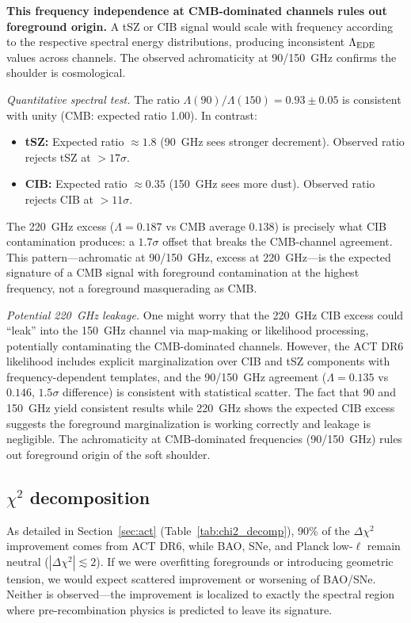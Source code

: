 \documentclass[twocolumn,showpacs,preprintnumbers,amsmath,amssymb,prd]{revtex4-2}
\begin{document}
\textbf{This frequency independence at CMB-dominated channels rules out 
foreground origin.} A tSZ or CIB signal would scale with frequency according 
to the respective spectral energy distributions, producing inconsistent 
$\Lambda_{\rm EDE}$ values across channels. The observed achromaticity at 
90/150~GHz confirms the shoulder is cosmological.

\emph{Quantitative spectral test.} The ratio $\Lambda(90)/\Lambda(150) = 
0.93 \pm 0.05$ is consistent with unity (CMB: expected ratio 1.00). 
In contrast:
\begin{itemize}
\item \textbf{tSZ:} Expected ratio $\approx 1.8$ (90~GHz sees stronger decrement). 
Observed ratio rejects tSZ at $>17\sigma$.
\item \textbf{CIB:} Expected ratio $\approx 0.35$ (150~GHz sees more dust). 
Observed ratio rejects CIB at $>11\sigma$.
\end{itemize}
The 220~GHz excess ($\Lambda = 0.187$ vs CMB average $0.138$) is precisely 
what CIB contamination produces: a $1.7\sigma$ offset that breaks the 
CMB-channel agreement. This pattern---achromatic at 90/150~GHz, excess 
at 220~GHz---is the expected signature of a CMB signal with foreground 
contamination at the highest frequency, not a foreground masquerading as CMB.

\emph{Potential 220~GHz leakage.} One might worry that the 220~GHz CIB 
excess could ``leak'' into the 150~GHz channel via map-making or likelihood 
processing, potentially contaminating the CMB-dominated channels. However, 
the ACT DR6 likelihood includes explicit marginalization over CIB and tSZ 
components with frequency-dependent templates, and the 90/150~GHz agreement 
($\Lambda = 0.135$ vs $0.146$, $1.5\sigma$ difference) is consistent with 
statistical scatter. The fact that 90 and 150~GHz yield consistent results 
while 220~GHz shows the expected CIB excess suggests the foreground 
marginalization is working correctly and leakage is negligible. The 
achromaticity at CMB-dominated frequencies (90/150~GHz) rules out foreground 
origin of the soft shoulder.

\subsection{$\chi^2$ decomposition}

As detailed in Section~\ref{sec:act} (Table~\ref{tab:chi2_decomp}), 
90\% of the $\Delta\chi^2$ improvement comes from ACT DR6, while 
BAO, SNe, and Planck low-$\ell$ remain neutral ($|\Delta\chi^2| \lesssim 2$).
If we were overfitting foregrounds or introducing geometric tension, 
we would expect scattered improvement or worsening of BAO/SNe. Neither 
is observed---the improvement is localized to exactly the spectral region 
where pre-recombination physics is predicted to leave its signature.
\end{document}
